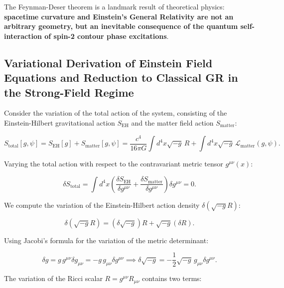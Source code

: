 \documentclass[11pt,a4paper]{article}
\theoremstyle{definition}
\begin{document}
The Feynman-Deser theorem is a landmark result of theoretical physics: \textbf{spacetime curvature and Einstein's General Relativity are not an arbitrary geometry, but an inevitable consequence of the quantum self-interaction of spin-2 contour phase excitations}.

\subsection{Variational Derivation of Einstein Field Equations and Reduction to Classical GR in the Strong-Field Regime}\label{sec:2.2}

Consider the variation of the total action of the system, consisting of the Einstein-Hilbert gravitational action $S_{\text{EH}}$ and the matter field action $S_{\text{matter}}$:

\begin{equation}\label{eq:2.15}\tag{2.15}
S_{\text{total}}[g, \psi] = S_{\text{EH}}[g] + S_{\text{matter}}[g, \psi] = \frac{c^4}{16\pi G} \int d^4x \sqrt{-g} \, R + \int d^4x \sqrt{-g} \, \mathcal{L}_{\text{matter}}(g, \psi).
\end{equation}

Varying the total action with respect to the contravariant metric tensor $g^{\mu\nu}(x)$:

\begin{equation}\label{eq:2.16}\tag{2.16}
\delta S_{\text{total}} = \int d^4x \left( \frac{\delta S_{\text{EH}}}{\delta g^{\mu\nu}} + \frac{\delta S_{\text{matter}}}{\delta g^{\mu\nu}} \right) \delta g^{\mu\nu} = 0.
\end{equation}

We compute the variation of the Einstein-Hilbert action density $\delta(\sqrt{-g} R)$:

\begin{equation}\label{eq:2.17}\tag{2.17}
\delta(\sqrt{-g} R) = (\delta\sqrt{-g}) R + \sqrt{-g} (\delta R).
\end{equation}

Using Jacobi's formula for the variation of the metric determinant:

\begin{equation}\label{eq:2.18}\tag{2.18}
\delta g = g \, g^{\mu\nu} \delta g_{\mu\nu} = -g \, g_{\mu\nu} \delta g^{\mu\nu} \implies \delta\sqrt{-g} = -\frac{1}{2}\sqrt{-g} \, g_{\mu\nu} \delta g^{\mu\nu}.
\end{equation}

The variation of the Ricci scalar $R = g^{\mu\nu} R_{\mu\nu}$ contains two terms:
\end{document}
